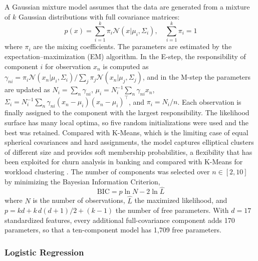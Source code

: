 \documentclass[conference]{IEEEtran}
\begin{document}
A Gaussian mixture model \cite{reynolds2009gaussian} assumes that the data are generated from a mixture of $k$ Gaussian distributions with full covariance matrices:
\begin{equation}
    p(x) = \sum_{i=1}^{k} \pi_i \mathcal{N}(x | \mu_i, \Sigma_i), \quad \sum_{i=1}^{k}\pi_i = 1
\end{equation}
where $\pi_i$ are the mixing coefficients. The parameters are estimated by the expectation--maximization (EM) algorithm. In the E-step, the responsibility of component $i$ for observation $x_n$ is computed as $\gamma_{ni}=\pi_i\mathcal{N}(x_n|\mu_i,\Sigma_i)/\sum_{j}\pi_j\mathcal{N}(x_n|\mu_j,\Sigma_j)$, and in the M-step the parameters are updated as $N_i=\sum_n\gamma_{ni}$, $\mu_i=N_i^{-1}\sum_n\gamma_{ni}x_n$, $\Sigma_i=N_i^{-1}\sum_n\gamma_{ni}(x_n-\mu_i)(x_n-\mu_i)^{\top}$, and $\pi_i=N_i/n$. Each observation is finally assigned to the component with the largest responsibility. The likelihood surface has many local optima, so five random initializations were used and the best was retained. Compared with K-Means, which is the limiting case of equal spherical covariances and hard assignments, the model captures elliptical clusters of different size and provides soft membership probabilities, a flexibility that has been exploited for churn analysis in banking \cite{saxena2023} and compared with K-Means for workload clustering \cite{patel2020clustering}. The number of components was selected over $n\in[2,10]$ by minimizing the Bayesian Information Criterion,
\begin{equation}
    \mathrm{BIC} = p \ln N - 2 \ln \hat{L}
\end{equation}
where $N$ is the number of observations, $\hat{L}$ the maximized likelihood, and $p = kd + k\,d(d+1)/2 + (k-1)$ the number of free parameters. With $d=17$ standardized features, every additional full-covariance component adds 170 parameters, so that a ten-component model has 1,709 free parameters.

\subsubsection{Logistic Regression}
\end{document}
